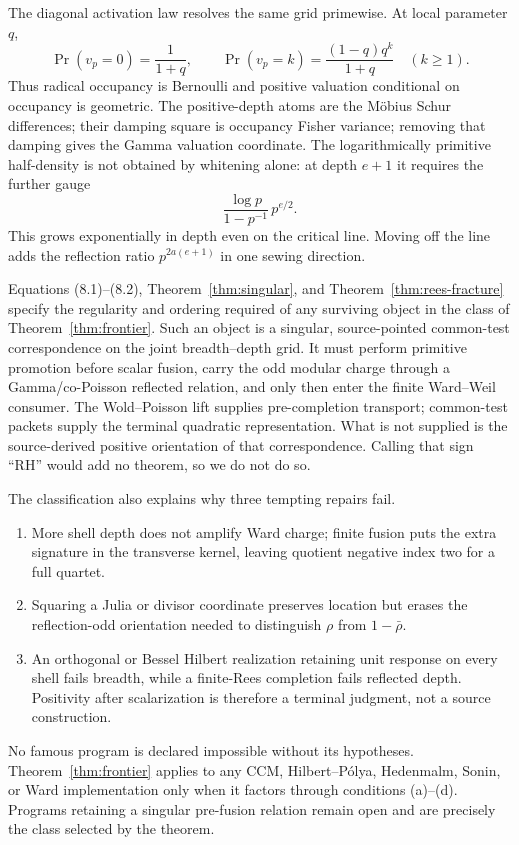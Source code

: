 \documentclass[11pt]{article}
\theoremstyle{definition}
\theoremstyle{remark}
\begin{document}
The diagonal activation law resolves the same grid primewise.  At local parameter $q$,
\[
 \Pr(v_p=0)=\frac1{1+q},\qquad
 \Pr(v_p=k)=\frac{(1-q)q^k}{1+q}\quad(k\geq1).
 \tag{8.1}
\]
Thus radical occupancy is Bernoulli and positive valuation conditional on occupancy is geometric.
The positive-depth atoms are the M\"obius Schur differences; their damping square is occupancy
Fisher variance; removing that damping gives the Gamma valuation coordinate.  The logarithmically
primitive half-density is not obtained by whitening alone: at depth $e+1$ it requires the further
gauge
\[
 \frac{\log p}{1-p^{-1}}\,p^{e/2}.
 \tag{8.2}
\]
This grows exponentially in depth even on the critical line.  Moving off the line adds the
reflection ratio $p^{2a(e+1)}$ in one sewing direction.

Equations (8.1)--(8.2), Theorem~\ref{thm:singular}, and
Theorem~\ref{thm:rees-fracture} specify the regularity and ordering required of any surviving
object in the class of Theorem~\ref{thm:frontier}.  Such an object is a singular, source-pointed
common-test correspondence on the joint breadth--depth grid.  It
must perform primitive promotion before scalar fusion, carry the odd modular charge through a
Gamma/co-Poisson reflected relation, and only then enter the finite Ward--Weil consumer.  The
Wold--Poisson lift supplies pre-completion transport; common-test packets supply the terminal
quadratic representation.  What is not supplied is the source-derived positive orientation of
that correspondence.  Calling that sign ``RH'' would add no theorem, so we do not do so.

The classification also explains why three tempting repairs fail.
\begin{enumerate}[label=\textup{(\roman*)}]
\item More shell depth does not amplify Ward charge; finite fusion puts the extra signature in the
transverse kernel, leaving quotient negative index two for a full quartet.
\item Squaring a Julia or divisor coordinate preserves location but erases the reflection-odd
orientation needed to distinguish $\rho$ from $1-\bar\rho$.
\item An orthogonal or Bessel Hilbert realization retaining unit response on every shell fails
breadth, while a finite-Rees completion fails reflected depth.  Positivity after scalarization is
therefore a terminal judgment, not a source construction.
\end{enumerate}

No famous program is declared impossible without its hypotheses.  Theorem~\ref{thm:frontier}
applies to any CCM, Hilbert--P\'olya, Hedenmalm, Sonin, or Ward implementation only when it factors
through conditions (a)--(d).  Programs retaining a singular pre-fusion relation remain open and
are precisely the class selected by the theorem.
\end{document}
